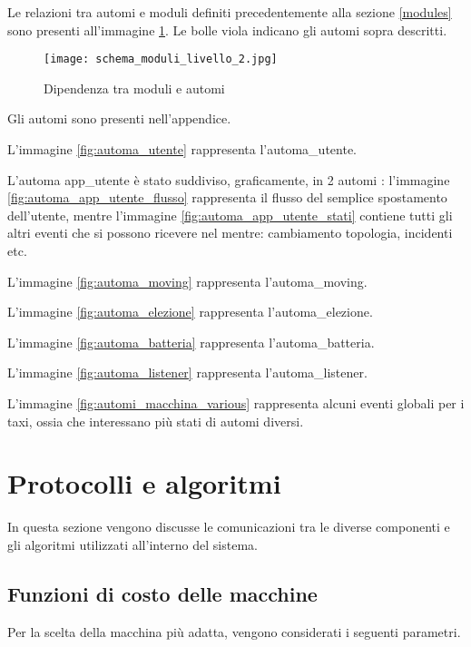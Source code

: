 Le relazioni tra automi e moduli definiti precedentemente alla sezione \ref{modules} sono presenti all'immagine \ref{fig:schema_moduli_livello_2}. Le bolle viola indicano gli automi sopra descritti.

\begin{figure}[htbp]
	\centering
	\texttt{[image: schema\_moduli\_livello\_2.jpg]}
	\caption{Dipendenza tra moduli e automi}
	\label{fig:schema_moduli_livello_2}
\end{figure}

\newpage

Gli automi sono presenti nell'appendice.

L'immagine \ref{fig:automa_utente} rappresenta l'automa\_utente.

L'automa app\_utente è stato suddiviso, graficamente, in 2 automi : l'immagine \ref{fig:automa_app_utente_flusso}  rappresenta il flusso del semplice spostamento dell'utente, mentre l'immagine \ref{fig:automa_app_utente_stati} contiene tutti gli altri eventi che si possono ricevere nel mentre: cambiamento topologia, incidenti etc.

L'immagine \ref{fig:automa_moving} rappresenta l'automa\_moving.

L'immagine \ref{fig:automa_elezione} rappresenta l'automa\_elezione.

L'immagine \ref{fig:automa_batteria} rappresenta l'automa\_batteria.

L'immagine \ref{fig:automa_listener} rappresenta l'automa\_listener.

L'immagine \ref{fig:automi_macchina_various} rappresenta alcuni eventi globali per i taxi, ossia che interessano più stati di automi diversi.

\section{Protocolli e algoritmi}
In questa sezione vengono discusse le comunicazioni tra le diverse componenti e gli algoritmi utilizzati all'interno del sistema.

\subsection{Funzioni di costo delle macchine} \label{funzioni_di_costo_macchine}
Per la scelta della macchina più adatta, vengono considerati i seguenti parametri.

